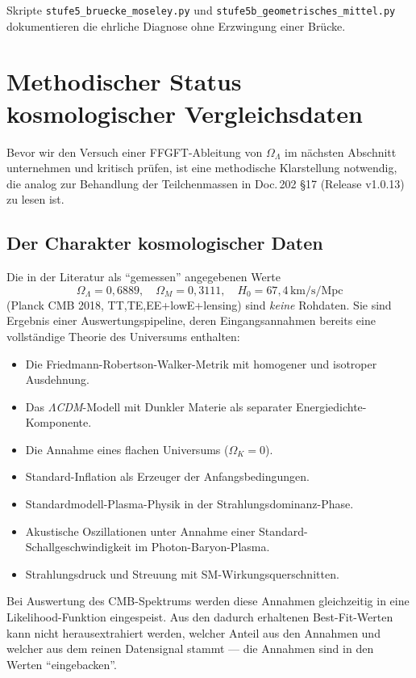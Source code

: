 Skripte \texttt{stufe5\_bruecke\_moseley.py} und \texttt{stufe5b\_geometrisches\_mittel.py} dokumentieren die ehrliche Diagnose ohne Erzwingung einer Brücke.

\section{Methodischer Status kosmologischer Vergleichsdaten}
\label{sec:kosmologie_methodik}

Bevor wir den Versuch einer FFGFT-Ableitung von \(\Omega_\Lambda\) im nächsten Abschnitt unternehmen und kritisch prüfen, ist eine methodische Klarstellung notwendig, die analog zur Behandlung der Teilchenmassen in Doc.\,202 \S17 (Release v1.0.13) zu lesen ist.

\subsection{Der Charakter kosmologischer Daten}

Die in der Literatur als ``gemessen'' angegebenen Werte
\begin{equation}
\Omega_\Lambda = 0{,}6889, \quad \Omega_M = 0{,}3111, \quad H_0 = 67{,}4\,\text{km/s/Mpc}
\end{equation}
(Planck CMB 2018, TT,TE,EE+lowE+lensing) sind \emph{keine} Rohdaten. Sie sind Ergebnis einer Auswertungspipeline, deren Eingangsannahmen bereits eine vollständige Theorie des Universums enthalten:

\begin{itemize}
\item Die Friedmann-Robertson-Walker-Metrik mit homogener und isotroper Ausdehnung.
\item Das \emph{\(\Lambda\)CDM}-Modell mit Dunkler Materie als separater Energiedichte-Komponente.
\item Die Annahme eines flachen Universums (\(\Omega_K = 0\)).
\item Standard-Inflation als Erzeuger der Anfangsbedingungen.
\item Standardmodell-Plasma-Physik in der Strahlungsdominanz-Phase.
\item Akustische Oszillationen unter Annahme einer Standard-Schallgeschwindigkeit im Photon-Baryon-Plasma.
\item Strahlungsdruck und Streuung mit SM-Wirkungsquerschnitten.
\end{itemize}

Bei Auswertung des CMB-Spektrums werden diese Annahmen gleichzeitig in eine Likelihood-Funktion eingespeist. Aus den dadurch erhaltenen Best-Fit-Werten kann nicht herausextrahiert werden, welcher Anteil aus den Annahmen und welcher aus dem reinen Datensignal stammt — die Annahmen sind in den Werten ``eingebacken''.

